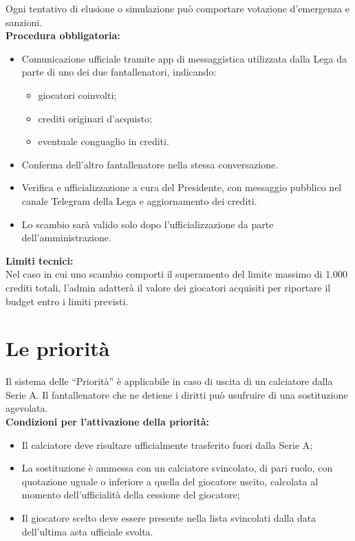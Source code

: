 \noindent
Ogni tentativo di elusione o simulazione può comportare votazione d'emergenza e sanzioni.\\

\noindent \textbf{Procedura obbligatoria:}
\begin{itemize}
\item Comunicazione ufficiale tramite app di messaggistica utilizzata dalla Lega da parte di uno dei due fantallenatori, indicando:
  \begin{itemize}
  \item giocatori coinvolti;
  \item crediti originari d'acquisto;
  \item eventuale conguaglio in crediti.
  \end{itemize}
\item Conferma dell'altro fantallenatore nella stessa conversazione.
\item Verifica e ufficializzazione a cura del Presidente, con messaggio pubblico nel canale Telegram della Lega e aggiornamento dei crediti.
\item Lo scambio sarà valido solo dopo l'ufficializzazione da parte dell'amministrazione.
\end{itemize}

\noindent \textbf{Limiti tecnici:}\\
Nel caso in cui uno scambio comporti il superamento del limite massimo di 1.000 crediti totali, l'admin adatterà il valore dei giocatori acquisiti per riportare il budget entro i limiti previsti.

\section{Le priorità}
\label{art:6.4}

Il sistema delle “Priorità” è applicabile in caso di uscita di un calciatore dalla Serie A. Il fantallenatore che ne detiene i diritti può usufruire di una sostituzione agevolata. \\

\noindent \textbf{Condizioni per l'attivazione della priorità:}
\begin{itemize}
\item Il calciatore deve risultare ufficialmente trasferito fuori dalla Serie A;
\item La sostituzione è ammessa con un calciatore svincolato, di pari ruolo, con quotazione uguale o inferiore a quella del giocatore uscito, calcolata al momento dell'ufficialità della cessione del giocatore;
\item Il giocatore scelto deve essere presente nella lista svincolati dalla data dell'ultima asta ufficiale svolta.
\end{itemize}

